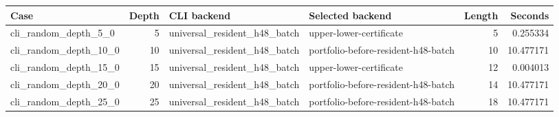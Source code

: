 {\small
\begin{tabular}{lrllrr}
\hline
Case & Depth & CLI backend & Selected backend & Length & Seconds \\
\hline
cli\_random\_depth\_5\_0 & 5 & universal\_resident\_h48\_batch & upper-lower-certificate & 5 & 0.255334 \\
cli\_random\_depth\_10\_0 & 10 & universal\_resident\_h48\_batch & portfolio-before-resident-h48-batch & 10 & 10.477171 \\
cli\_random\_depth\_15\_0 & 15 & universal\_resident\_h48\_batch & upper-lower-certificate & 12 & 0.004013 \\
cli\_random\_depth\_20\_0 & 20 & universal\_resident\_h48\_batch & portfolio-before-resident-h48-batch & 14 & 10.477171 \\
cli\_random\_depth\_25\_0 & 25 & universal\_resident\_h48\_batch & portfolio-before-resident-h48-batch & 18 & 10.477171 \\
\hline
\end{tabular}
}

